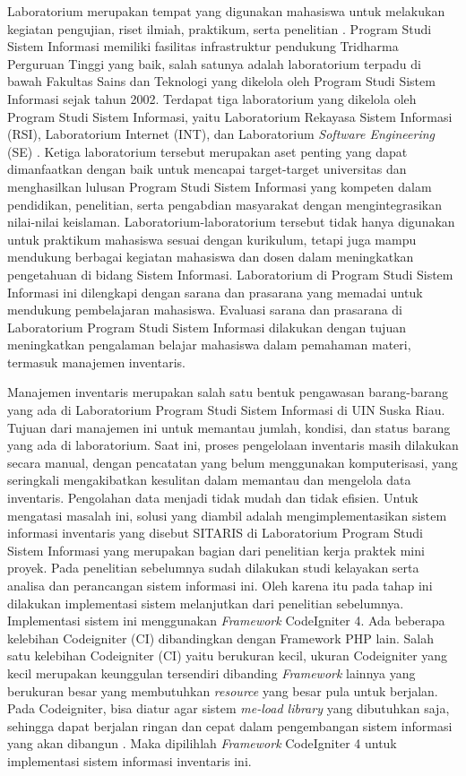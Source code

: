 Laboratorium merupakan tempat yang digunakan mahasiswa untuk melakukan kegiatan pengujian, riset ilmiah, praktikum, serta penelitian \cite{putri2013sistem}. Program Studi Sistem Informasi memiliki fasilitas infrastruktur pendukung Tridharma Perguruan Tinggi yang baik, salah satunya adalah laboratorium terpadu di bawah Fakultas Sains dan Teknologi yang dikelola oleh Program Studi Sistem Informasi sejak tahun 2002. Terdapat tiga laboratorium yang dikelola oleh Program Studi Sistem Informasi, yaitu Laboratorium Rekayasa Sistem Informasi (RSI), Laboratorium Internet (INT), dan Laboratorium \textit{Software Engineering} (SE) \cite{lab-si-website}. Ketiga laboratorium tersebut merupakan aset penting yang dapat dimanfaatkan dengan baik untuk mencapai target-target universitas dan menghasilkan lulusan Program Studi Sistem Informasi yang kompeten dalam pendidikan, penelitian, serta pengabdian masyarakat dengan mengintegrasikan nilai-nilai keislaman. Laboratorium-laboratorium tersebut tidak hanya digunakan untuk praktikum mahasiswa sesuai dengan kurikulum, tetapi juga mampu mendukung berbagai kegiatan mahasiswa dan dosen dalam meningkatkan pengetahuan di bidang Sistem Informasi. Laboratorium di Program Studi Sistem Informasi ini dilengkapi dengan sarana dan prasarana yang memadai untuk mendukung pembelajaran mahasiswa. Evaluasi sarana dan prasarana di Laboratorium Program Studi Sistem Informasi dilakukan dengan tujuan meningkatkan pengalaman belajar mahasiswa dalam pemahaman materi, termasuk manajemen inventaris.

Manajemen inventaris merupakan salah satu bentuk pengawasan barang-barang yang ada di Laboratorium Program Studi Sistem Informasi di UIN Suska Riau. Tujuan dari manajemen ini untuk memantau jumlah, kondisi, dan status barang yang ada di laboratorium. Saat ini, proses pengelolaan inventaris masih dilakukan secara manual, dengan pencatatan yang belum menggunakan komputerisasi, yang seringkali mengakibatkan kesulitan dalam memantau dan mengelola data inventaris. Pengolahan data menjadi tidak mudah dan tidak efisien. Untuk mengatasi masalah ini, solusi yang diambil adalah mengimplementasikan sistem informasi inventaris yang disebut SITARIS di Laboratorium Program Studi Sistem Informasi yang merupakan bagian dari penelitian kerja praktek mini proyek. Pada penelitian sebelumnya sudah dilakukan studi kelayakan serta analisa dan perancangan sistem informasi ini. Oleh karena itu pada tahap ini dilakukan implementasi sistem melanjutkan dari penelitian sebelumnya. Implementasi sistem ini menggunakan \textit{Framework} CodeIgniter 4. Ada beberapa kelebihan Codeigniter (CI) dibandingkan dengan Framework PHP lain. Salah satu kelebihan Codeigniter (CI) yaitu berukuran kecil, ukuran Codeigniter yang kecil merupakan keunggulan tersendiri dibanding \textit{Framework} lainnya yang berukuran besar yang membutuhkan \textit{resource} yang besar pula untuk berjalan. Pada Codeigniter, bisa diatur agar sistem \textit{me-load library} yang dibutuhkan saja, sehingga dapat berjalan ringan dan cepat dalam pengembangan sistem informasi yang akan dibangun \cite{hamonangan2021perancangan}. Maka dipilihlah \textit{Framework} CodeIgniter 4 untuk implementasi sistem informasi inventaris ini.

